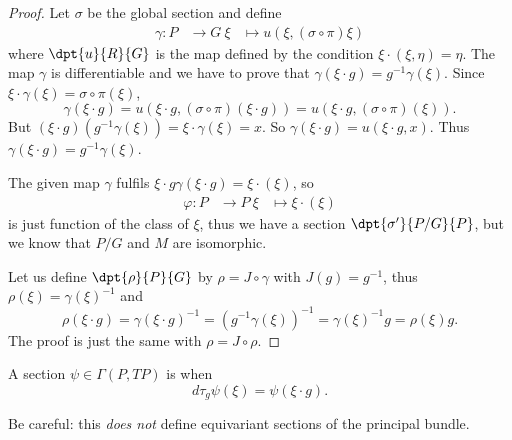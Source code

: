 \begin{proof}
						\subdem{\ref{enuymaii}$\Rightarrow$~\ref{enuymaiii}}
						Let $\sigma$ be the global section and define
						\begin{equation}
						\begin{aligned}
						\gamma \colon P & \to G\
							\xi             & \mapsto u(\xi,(\sigma\circ\pi)\xi)
							\end{aligned}
							\end{equation}
							where $\dpt{u}{R}{G}$ is the map defined by the condition $\xi\cdot(\xi,\eta)=\eta$. The map $\gamma$ is differentiable and we have to prove that $\gamma(\xi\cdot g)=g^{-1}\gamma(\xi)$. Since $\xi\cdot \gamma(\xi)=\sigma\circ\pi(\xi)$,
							\[
								\gamma(\xi\cdot g)=u(\xi\cdot g,(\sigma\circ\pi)(\xi\cdot g))=u(\xi\cdot g,(\sigma\circ\pi)(\xi)).
								\]
								But $(\xi\cdot g)(g^{-1}\gamma(\xi))=\xi\cdot\gamma(\xi)=x$. So $\gamma(\xi\cdot g)=u(\xi\cdot g,x)$. Thus $\gamma(\xi\cdot g)=g^{-1}\gamma(\xi)$.

								\subdem{\ref{enuymaiii}$\Rightarrow$~\ref{enuymaii}}
								The given map $\gamma$ fulfils $\xi\cdot g\gamma(\xi\cdot g)=\xi\cdot(\xi)$, so
								\begin{equation}
								\begin{aligned}
								\varphi \colon P & \to P\
									\xi              & \mapsto \xi\cdot(\xi)
									\end{aligned}
									\end{equation}
									is just function of the class of $\xi$, thus we have a section $\dpt{\sigma'}{P/G}{P}$, but we know that $P/G$ and $M$ are isomorphic.

									\subdem{\ref{enuymaiii}$\Rightarrow$~\ref{enuymaiv}}
									Let us define $\dpt{\rho}{P}{G}$ by $\rho=J\circ\gamma$ with $J(g)=g^{-1}$, thus $\rho(\xi)=\gamma(\xi)^{-1}$ and
									\[
										\rho(\xi\cdot g)=\gamma(\xi\cdot g)^{-1}=(g^{-1}\gamma(\xi))^{-1}=\gamma(\xi)^{-1} g=\rho(\xi)g.
										\]
										\subdem{\ref{enuymaiv}$\Rightarrow$~\ref{enuymaiii}} The proof is just the same with $\rho=J\circ\rho$.
										\end{proof}

										\begin{definition}
										A section $\psi\in\Gamma(P,TP)$ is  when
										\[
											d\tau_{g}\psi(\xi)=\psi(\xi\cdot g).
											\]
											\label{DefEqVectPrinc}
											\end{definition}
											Be careful: this \emph{does not} define equivariant sections of the principal bundle.
